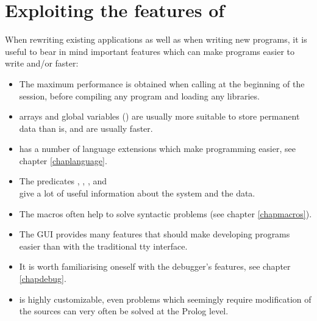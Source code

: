 \section{Exploiting the features of {\eclipse}}
When rewriting existing applications as well as when writing new programs,
it is useful to bear in mind important {\eclipse} features which can make
programs easier to write and/or faster:
\begin{itemize}
\item The maximum performance is obtained when calling
at the beginning of the session, before compiling any program and loading
any libraries.

\item {\eclipse} arrays and global variables
()%
are usually
more suitable to store permanent data than
 is, and are usually
faster.

\item {\eclipse} has a number of language extensions which make programming
easier, see chapter \ref{chaplanguage}.

\item The predicates , ,
,  and\\
give a lot of useful information about the system and the data.

\item The {\eclipse} macros often help to solve syntactic problems
(see chapter \ref{chapmacros}).

\item The {\tkeclipse} GUI provides many features that should make
developing programs easier than with the traditional tty interface.

\item It is worth familiarising oneself with the debugger's features,
see chapter \ref{chapdebug}.

\item {\eclipse} is highly customizable, even problems which seemingly
require modification of the {\eclipse} sources
can very often be solved at the Prolog level.
\end{itemize}

